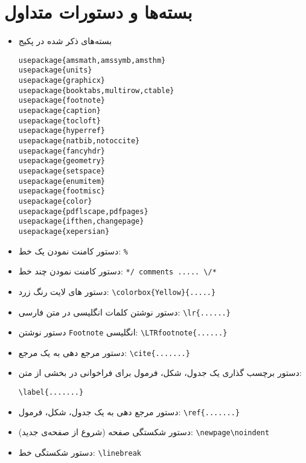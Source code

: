 \section{بسته‌ها و دستورات متداول}
\begin{itemize}
\item
بسته‌های ذکر شده در پکیج
\begin{latin}
\verb!usepackage{amsmath,amssymb,amsthm}!\\
\verb!usepackage{units}!\\
\verb!usepackage{graphicx}!\\
\verb!usepackage{booktabs,multirow,ctable}!\\
\verb!usepackage{footnote}!\\
\verb!usepackage{caption}!\\
\verb!usepackage{tocloft}!\\
\verb!usepackage{hyperref}!\\
\verb!usepackage{natbib,notoccite}!\\
\verb!usepackage{fancyhdr}!\\
\verb!usepackage{geometry}!\\
\verb!usepackage{setspace}!\\
\verb!usepackage{enumitem}!\\
\verb!usepackage{footmisc}!\\
\verb!usepackage{color}!\\
\verb!usepackage{pdflscape,pdfpages}!\\
\verb!usepackage{ifthen,changepage}!\\
\verb!usepackage{xepersian}!
\end{latin}
\item
دستور کامنت نمودن یک خط:
\verb!%!
\item
دستور کامنت نمودن چند خط:
\verb!*/ comments ..... \/*!
\item
دستور های لایت رنگ زرد:
\verb!\colorbox{Yellow}{.....}!
\item
دستور نوشتن کلمات انگلیسی در متن فارسی:
\verb!\lr{......}!
\item
دستور نوشتن
\verb!Footnote!
انگلیسی:
\verb!\LTRfootnote{......}!
\item
دستور مرجع دهی به یک مرجع:
\verb!\cite{.......}!
\item
دستور برچسب گذاری یک جدول، شکل، فرمول برای فراخوانی در بخشی از متن:

\verb!\label{.......}!
\item
دستور مرجع دهی به یک جدول، شکل، فرمول:
\verb!\ref{.......}!
\item
دستور شکستگی صفحه (شروع از صفحه‌ی جدید):
\verb!\newpage\noindent!
\item
دستور شکستگی خط:
\verb!\linebreak!
\end{itemize}
